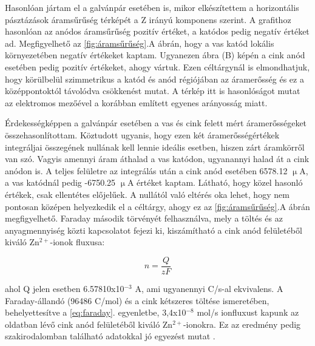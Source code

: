 Hasonlóan jártam el a galvánpár esetében is, mikor elkészítettem a horizontális pásztázások áramsűrűség térképét a Z irányú komponens szerint. A grafithoz hasonlóan az anódos áramsűrűség pozitív értéket, a katódos pedig negatív értéket ad. Megfigyelhető az \ref{fig:áramsűrűség}.A ábrán, hogy a vas katód lokális környezetében negatív értékeket kaptam. Ugyanezen ábra (B) képén a cink anód esetében pedig pozitív értékeket, ahogy vártuk. Ezen céltárgynál is elmondhatjuk, hogy körülbelül szimmetrikus a katód és anód régiójában az áramerősség és ez a középpontoktól távolódva csökkenést mutat. A térkép itt is hasonlóságot mutat az elektromos mezőével a korábban említett egyenes arányosság miatt. 

Érdekességképpen a galvánpár esetében a vas és cink felett mért áramerősségeket összehasonlítottam. Köztudott ugyanis, hogy ezen két áramerősségértékek integráljai összegének nullának kell lennie ideális esetben, hiszen zárt áramkörről van szó. Vagyis amennyi áram áthalad a vas katódon, ugyanannyi halad át a cink anódon is. A teljes felületre az integrálás után a cink anód esetében 6578.12 $\upmu$A, a vas katódnál pedig -6750.25 $\upmu$A értéket kaptam. Látható, hogy közel hasonló értékek, csak ellentétes előjelűek. A nullától való eltérés oka lehet, hogy nem pontosan középen helyezkedik el a céltárgy, ahogy ez az \ref{fig:áramsűrűség}.A ábrán megfigyelhető. Faraday második törvényét felhasználva, mely a töltés és az anyagmennyiség közti kapcsolatot fejezi ki, kiszámítható a cink anód felületéből kiváló Zn$^{2+}$-ionok fluxusa:

\begin{equation}
{n}= \frac{Q}{zF}
\label{eq:faraday}
\end{equation}

ahol Q jelen esetben 6.57810x10$^{-3}$ A, ami ugyanennyi C/s-al ekvivalens. A Faraday-állandó (96486 C/mol) és a cink kétszeres töltése ismeretében, behelyettesítve a \ref{eq:faraday}. egyenletbe, 3,4x10$^{-8}$ mol/s ionfluxust kapunk az oldatban lévő cink anód felületéből kiváló Zn$^{2+}$-ionokra. Ez az eredmény pedig szakirodalomban található adatokkal jó egyezést mutat \cite{kiss2013investigation}.


